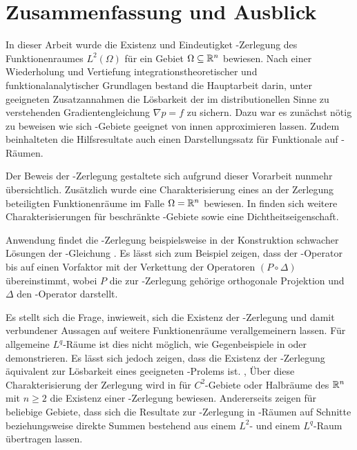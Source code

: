 \chapter{Zusammenfassung und Ausblick}

In dieser Arbeit wurde die Existenz und Eindeutigket \helmholtz\hyp{}Zerlegung des Funktionenraumes $L^2(\Omega)$ für ein Gebiet $\Omega \subseteq \mathbb{R}^n$ bewiesen.
Nach einer Wiederholung und Vertiefung integrationstheoretischer und funktionalanalytischer Grundlagen bestand die Hauptarbeit darin, unter geeigneten Zusatzannahmen die Lösbarkeit der im distributionellen Sinne zu verstehenden Gradientengleichung $\nabla p = f$ zu sichern.
Dazu war es zunächst nötig zu beweisen wie sich \lipschitz\hyp{}Gebiete geeignet von innen approximieren lassen.
Zudem beinhalteten die Hilfsresultate auch einen Darstellungssatz für Funktionale auf \sobolev\hyp{}Räumen.

Der Beweis der \helmholtz\hyp{}Zerlegung gestaltete sich aufgrund dieser Vorarbeit nunmehr übersichtlich.
Zusätzlich wurde eine Charakterisierung eines an der Zerlegung beteiligten Funktionenräume im Falle $\Omega = \mathbb{R}^n$ bewiesen.
In \cite[S.81ff., II.2.5]{sohr2001navier} finden sich weitere Charakterisierungen für beschränkte \lipschitz\hyp{}Gebiete sowie eine Dichtheitseigenschaft.

Anwendung findet die \helmholtz\hyp{}Zerlegung beispielsweise in der Konstruktion schwacher Lösungen der \stokes\hyp{}Gleichung \cite[S.129f.]{sohr2001navier}. 
Es lässt sich zum Beispiel zeigen, dass der \stokes\hyp{}Operator bis auf einen Vorfaktor mit der Verkettung der Operatoren $(P \circ \Delta)$ übereinstimmt, wobei $P$ die zur \helmholtz\hyp{}Zerlegung gehörige orthogonale Projektion und $\Delta$ den \laplace\hyp{}Operator darstellt.

Es stellt sich die Frage, inwieweit, sich die Existenz der \helmholtz\hyp{}Zerlegung und damit verbundener Aussagen auf weitere Funktionenräume verallgemeinern lassen.
Für allgemeine $L^q$\hyp{}Räume ist dies nicht möglich, wie Gegenbeispiele in \cite{maslennikova1986elliptic} oder \cite{bogovski1986decomposition} demonstrieren.
Es lässt sich jedoch zeigen, dass die Existenz der \helmholtz\hyp{}Zerlegung äquivalent zur Lösbarkeit eines geeigneten \neumann\hyp{}Prolems ist. \cite{simader1992new}, \cite[S.146, Lemma III.1.2]{galdi2011navier}
Über diese Charakterisierung der Zerlegung wird in \cite[S.152, Theorem III.1.2]{galdi2011navier} für $C^2$-Gebiete oder Halbräume des $\mathbb{R}^n$ mit $n \geq 2$ die Existenz einer \helmholtz\hyp{}Zerlegung bewiesen.
Andererseits zeigen \cite{farwig05thehelmholtz,farwig05anLq} für beliebige Gebiete, dass sich die Resultate zur \helmholtz\hyp{}Zerlegung in \hilbert\hyp{}Räumen auf Schnitte beziehungsweise direkte Summen bestehend aus einem $L^2$- und einem $L^q$\hyp{}Raum übertragen lassen.

